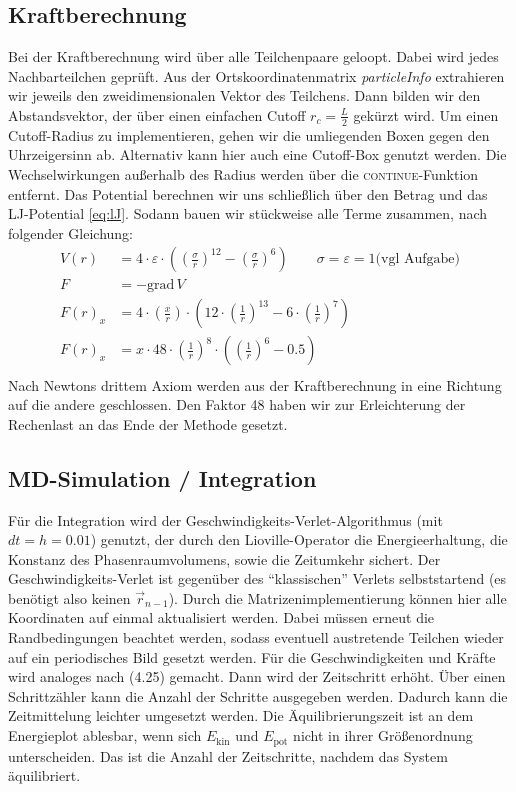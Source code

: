 \subsection*{Kraftberechnung}
Bei der Kraftberechnung wird über alle Teilchenpaare geloopt. Dabei wird jedes Nachbarteilchen geprüft. Aus der Ortskoordinatenmatrix \textit{particleInfo} extrahieren wir jeweils den zweidimensionalen Vektor des Teilchens. Dann bilden wir den Abstandsvektor, der über einen einfachen Cutoff $r_c = \frac{L}{2}$ gekürzt wird. Um einen Cutoff-Radius zu implementieren, gehen wir die umliegenden Boxen gegen den Uhrzeigersinn ab. Alternativ kann hier auch eine Cutoff-Box genutzt werden.
Die Wechselwirkungen außerhalb des Radius werden über die \textsc{continue}-Funktion entfernt. Das Potential berechnen wir uns schließlich über den Betrag und das LJ-Potential \eqref{eq:lJ}. Sodann bauen wir stückweise alle Terme zusammen, nach folgender Gleichung:
\begin{equation*}
\begin{split}
	V(r) &= 4\cdot \varepsilon \cdot \left( \left( \frac{\sigma}{r} \right)^12 - \left( \frac{\sigma}{r} \right)^6 \right) \qquad \sigma = \varepsilon = 1 \text{(vgl Aufgabe)} \\
		F &= -\text{grad} \,V\\
        F(r)_x &= 4 \cdot \left(\frac{x}{r}\right) \cdot \left(12\cdot\left(\frac{1}{r}\right)^{13} - 6\cdot\left(\frac{1}{r}\right)^7\right) \\
            F(r)_x &= x \cdot 48 \cdot \left( \frac{1}{r} \right)^8 \cdot \left(\left(\frac{1}{r}\right)^6 - 0.5\right) \\
\end{split}
\end{equation*}
Nach Newtons drittem Axiom werden aus der Kraftberechnung in eine Richtung auf die andere geschlossen. Den Faktor 48 haben wir zur Erleichterung der Rechenlast an das Ende der Methode gesetzt.

\subsection*{MD-Simulation / Integration}
Für die Integration wird der Geschwindigkeits-Verlet-Algorithmus (mit $dt=h=0.01$) genutzt, der durch den Lioville-Operator die Energieerhaltung, die Konstanz des Phasenraumvolumens, sowie die Zeitumkehr sichert. Der Geschwindigkeits-Verlet ist gegenüber des \enquote{klassischen} Verlets selbststartend (es benötigt also keinen $\vec{r}_{n-1}$). Durch die Matrizenimplementierung können hier alle Koordinaten auf einmal aktualisiert werden. Dabei müssen erneut die Randbedingungen beachtet werden, sodass eventuell austretende Teilchen wieder auf ein periodisches Bild gesetzt werden. Für die Geschwindigkeiten und Kräfte wird analoges nach (4.25) gemacht. Dann wird der Zeitschritt erhöht. Über einen Schrittzähler kann die Anzahl der Schritte ausgegeben werden. Dadurch kann die Zeitmittelung leichter umgesetzt werden. Die Äquilibrierungszeit ist an dem Energieplot ablesbar, wenn sich $E_{\text{kin}}$ und $E_{\text{pot}}$ nicht in ihrer Größenordnung unterscheiden. Das ist die Anzahl der Zeitschritte, nachdem das System äquilibriert.

